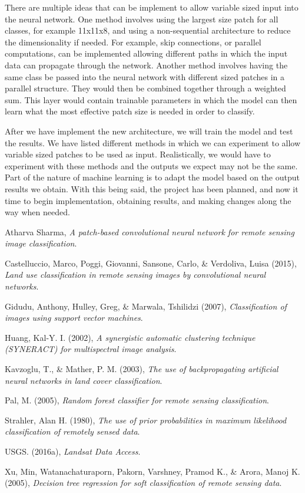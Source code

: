 \documentclass{article}
\begin{document}
There are multiple ideas that can be implement to allow variable sized input into the neural network. One method involves using the largest size patch for all classes, for example 11x11x8, and using a non-sequential architecture to reduce the dimensionality if needed. For example, skip connections, or parallel computations, can be implemented allowing different paths in which the input data can propagate through the network. Another method involves having the same class be passed into the neural network with different sized patches in a parallel structure. They would then be combined together through a weighted sum. This layer would contain trainable parameters in which the model can then learn what the most effective patch size is needed in order to classify.

After we have implement the new architecture, we will train the model and test the results. We have listed different methods in which we can experiment to allow variable sized patches to be used as input. Realistically, we would have to experiment with these methods and the outputs we expect may not be the same. Part of the nature of machine learning is to adapt the model based on the output results we obtain. With this being said, the project has been planned, and now it time to begin implementation, obtaining results, and making changes along the way when needed.

\pagebreak

\begin{thebibliography}{999}
	
	Atharva Sharma,
	\emph{A patch-based convolutional neural network for remote sensing image classification}.
	
	Castelluccio, Marco, Poggi, Giovanni, Sansone, Carlo, \& Verdoliva, Luisa (2015),
	\emph{Land use classification in remote sensing images by convolutional neural networks}.
	
	Gidudu, Anthony, Hulley, Greg, \& Marwala, Tshilidzi (2007),
	\emph{Classification of images using support vector machines}.
	
	Huang, Kal-Y. I. (2002),
	\emph{A synergistic automatic clustering technique (SYNERACT) for multispectral image analysis}.
	
	Kavzoglu, T., \& Mather, P. M. (2003),
	\emph{The use of backpropagating artificial neural
		networks in land cover classification}.
	
	Pal, M. (2005),
	\emph{Random forest classifier for remote sensing classification}.
	
	Strahler, Alan H. (1980),
	\emph{The use of prior probabilities in maximum likelihood classification of remotely sensed data}.
	
	USGS. (2016a),
	\emph{Landsat Data Access}.
	
	Xu, Min, Watanachaturaporn, Pakorn, Varshney, Pramod K., \& Arora, Manoj K. (2005),
	\emph{Decision tree regression for soft classification of remote sensing data}.
	
\end{thebibliography}
\end{document}
